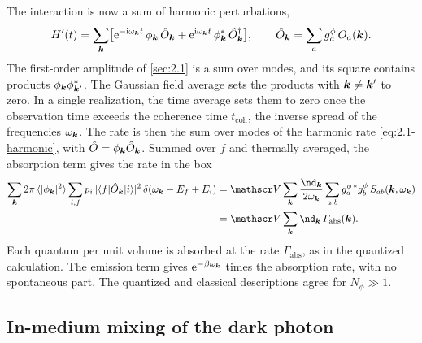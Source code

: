 The interaction is now a sum of harmonic perturbations,
\begin{equation*}
  H'(t) = \sum_{\bm{k}}\bigl[\mathrm{e}^{-\mathrm{i}\omega_{\bm{k}}t}\,\phi_{\bm{k}}\,\hat{O}_{\bm{k}} + \mathrm{e}^{\mathrm{i}\omega_{\bm{k}}t}\,\phi_{\bm{k}}^*\,\hat{O}_{\bm{k}}^\dagger\bigr], \qquad
  \hat{O}_{\bm{k}} = \sum_ag^\phi_a\,O_a(\bm{k}) .
\end{equation*}
The first-order amplitude of \cref{sec:2.1} is a sum over modes, and its square contains products $\phi_{\bm{k}}\phi_{\bm{k}'}^*$. The Gaussian field average sets the products with $\bm{k} \ne \bm{k}'$ to zero. In a single realization, the time average sets them to zero once the observation time exceeds the coherence time $t_{\mathrm{coh}}$, the inverse spread of the frequencies $\omega_{\bm{k}}$. The rate is then the sum over modes of the harmonic rate \cref{eq:2.1-harmonic}, with $\hat{O} = \phi_{\bm{k}}\hat{O}_{\bm{k}}$. Summed over $f$ and thermally averaged, the absorption term gives the rate in the box
\begin{equation*}
  \begin{aligned}
  \sum_{\vect{k}}2\pi\,\langle|\phi_{\vect{k}}|^2\rangle\sum_{i,f}p_i\,|\langle f|\op{O}_{\vect{k}}|i\rangle|^2\,\delta(\omega_{\vect{k}} - E_f + E_i)
  &= \Vol\sum_{\vect{k}}\frac{\nd_{\vect{k}}}{2\omega_{\vect{k}}}\sum_{a,b}g^{\phi\,*}_ag^\phi_b\,S_{ab}(\vect{k},\omega_{\vect{k}}) \\
  &= \Vol\sum_{\vect{k}}\nd_{\vect{k}}\,\varGamma_{\mathrm{abs}}(\vect{k}) .
  \end{aligned}
\end{equation*}
Each quantum per unit volume is absorbed at the rate $\varGamma_{\mathrm{abs}}$, as in the quantized calculation. The emission term gives $\mathrm{e}^{-\beta\omega_{\bm{k}}}$ times the absorption rate, with no spontaneous part. The quantized and classical descriptions agree for $N_\phi \gg 1$.

\subsection{In-medium mixing of the dark photon}

